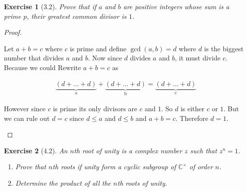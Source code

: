 \documentclass[12pt,leqno]{article}
\numberwithin{equation}{section}
\newtheorem*{exer}{Exercise}
\theoremstyle{definition}
\begin{document}
\begin{exer}[3.2]Prove that if $a$ and $b$ are positive integers whose sum is a prime $p$, their greatest common divisor is $1$.

\end{exer}

\begin{proof}[Proof]
\begin{enumerate}

        Let $a + b = c$ where $c$ is prime and define $\gcd (a, b) = d$ where
        $d$ is the biggest number that divides $a$ and $b$. Now since $d$
        divides $a$ and $b$, it must divide $c$. Because we could Rewrite $a +
        b = c$ as

        \begin{align*}
            \underbrace{(d + \dots + d)}_\textrm{a} + \underbrace{(d + \dots +
            d)}_\textrm{b} = \underbrace{(d + \dots + d)}_\textrm{c}
        \end{align*}
        
        However since $c$ is prime its only divisors are $c$ and $1$. So $d$ is
        either $c$ or $1$.  But we can rule out $d = c$ since $d \leq a$ and $d
        \leq b$ and $a + b = c$. Therefore $d = 1$.

\end{enumerate}

\end{proof}



\begin{exer}[4.2]An $n$th root of unity is a complex number $z$ such that $z^n=1$. 
\begin{enumerate}
\item[(a)] Prove that $n$th roots if unity form a cyclic subgroup of $\mathbb C^{\times}$ of order $n$.
\item[(b)] Determine the product of all the $n$th roots of unity. 
\end{enumerate}

\end{exer}
\end{document}
